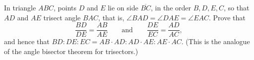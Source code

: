 In triangle $ABC$, points $D$ and $E$ lie on side $\overline{BC}$, in the order $B,D,E,C$, so that $AD$ and $AE$ trisect angle $BAC$, that is, $\angle BAD=\angle DAE=\angle EAC$. Prove that
\[\dfrac{BD}{DE}=\dfrac{AB}{AE}\qquad\text{and}\qquad\dfrac{DE}{EC}=\dfrac{AD}{AC},\]
and hence that $BD:DE:EC=AB\cdot AD:AD\cdot AE:AE\cdot AC$. (This is the analogue of the angle bisector theorem for trisectors.)
